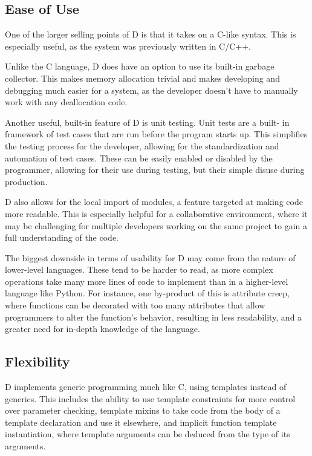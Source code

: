 \subsection{Ease of Use}
One of the larger selling points of D is that it takes on a C-like syntax.
This is especially useful, as the system was previously written in C/C++.
\par
Unlike the C language, D does have an option to use its built-in garbage
collector. This makes memory allocation trivial and makes developing and
debugging much easier for a system, as the developer doesn't have to manually
work with any deallocation code. 
\par
Another useful, built-in feature of D is unit testing. Unit tests are a built-
in framework of test cases that are run before the program starts up. This
simplifies the testing process for the developer, allowing for the
standardization and automation of test cases. These can be easily enabled or
disabled by the programmer, allowing for their use during testing, but their
simple disuse during production.
\par
D also allows for the local import of modules, a feature targeted at making code
more readable. This is especially helpful for a collaborative environment, where
it may be challenging for multiple developers working on the same project to
gain a full understanding of the code.
\par
The biggest downside in terms of usability for D may come from the nature of
lower-level languages. These tend to be harder to read, as more complex
operations take many more lines of code to implement than in a higher-level
language like Python. For instance, one by-product of this is attribute creep,
where functions can be decorated with too many attributes that allow programmers
to alter the function's behavior, resulting in less readability, and a greater
need for in-depth knowledge of the language.

\subsection{Flexibility}
D implements generic programming much like C, using templates instead of
generics. This includes the ability to use template constraints for more control
over parameter checking, template mixins to take code from the body of a
template declaration and use it elsewhere, and implicit function template
instantiation, where template arguments can be deduced from the type of its
arguments.

